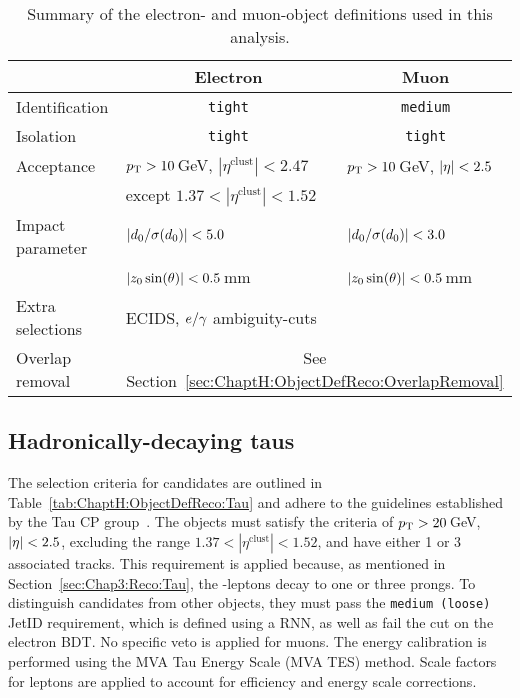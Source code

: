 \begin{table}[!htbp]
  \begin{tabular}{ l|l|l }
    \toprule
    & \multicolumn{1}{c|}{Electron} & \multicolumn{1}{c}{Muon} \\
    \midrule
    Identification  & \multicolumn{1}{c|}{\texttt{tight}} &  \multicolumn{1}{c}{\texttt{medium}}\\
    Isolation         & \multicolumn{1}{c|}{\texttt{tight}}  & \multicolumn{1}{c}{\texttt{tight}} \\
    Acceptance    & $p_{\text{T}} > 10\,$GeV, $|\eta^\mathrm{clust}| < 2.47$  & $p_{\text{T}} > 10\,$GeV, $|\eta| < 2.5$ \\
                     &  except $1.37 < |\eta^\mathrm{clust}| < 1.52$          & \\
    Impact parameter & $|d_{0}/\sigma(d_{0})| < 5.0$                   & $|d_{0}/\sigma(d_{0})| < 3.0$ \\
                     & $|z_{0} \sin(\theta)| < 0.5\,$mm                      & $|z_{0} \sin(\theta)| < 0.5\,$mm \\
    
    Extra selections & ECIDS, $e/\gamma$ ambiguity-cuts &  \\
    \midrule
    Overlap removal & \multicolumn{2}{c}{See Section~\ref{sec:ChaptH:ObjectDefReco:OverlapRemoval}} \\

    \bottomrule
  \end{tabular}
  \caption{Summary of the electron- and muon-object definitions used in this analysis.}
   \label{tab:ChaptH:ObjectDefReco:Electrons_Muons} %
\end{table}


%
\subsection{Hadronically-decaying taus}
\label{sec:ChaptH:ObjectDefReco:tau}
The selection criteria for \tauhad candidates are outlined in Table~\ref{tab:ChaptH:ObjectDefReco:Tau} 
and adhere to the guidelines established by the Tau CP group~\cite{ATLAS:2015boj, ATLAS:2019uhp}. 
The \tauhad objects must satisfy the criteria of $p_{\text{T}} > 20\,$GeV, $|\eta| < 2.5$, excluding the range 
$1.37 < |\eta^\mathrm{clust}| < 1.52$, and have either 1 or 3 associated tracks. 
This requirement is applied because, as mentioned in Section~\ref{sec:Chap3:Reco:Tau}, the \Ptau-leptons
decay to one or three prongs.
To distinguish \tauhad candidates from other objects, they must pass the \texttt{medium (loose)} JetID 
requirement, which is defined using a RNN, as well as fail the cut 
on the electron BDT. No specific veto is applied for muons. The energy calibration is performed using 
the MVA Tau Energy Scale (MVA TES) method.
Scale factors for leptons are applied to 
account for efficiency and energy scale corrections. %



